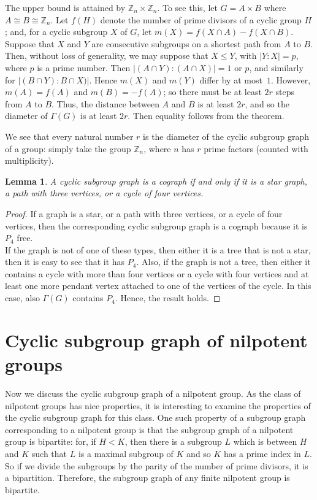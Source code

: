 \documentclass[11pt,twoside]{amsart}
\def \Z {{\mathbb{Z}}}
\def \Ga {{\Gamma }}
\newtheorem{lemma}[theorem]{Lemma}
\begin{document}
The upper bound is attained by $\Z_n\times\Z_n$. To see this, let
$G=A\times B$ where $A\cong B\cong\Z_n$. Let $f(H)$ denote the number of
prime divisors of a cyclic group $H$; and, for a cyclic subgroup $X$ of $G$,
let $m(X)=f(X\cap A)-f(X\cap B)$. Suppose that $X$ and $Y$ are consecutive
subgroups on a shortest path from $A$ to $B$. Then, without loss of
generality, we may suppose that $X\le Y$, with $|Y:X|=p$, where $p$ is a prime
number. Then $|(A\cap Y):(A\cap X)|=1$ or $p$, and similarly for
$|(B\cap Y):B\cap X)|$. Hence $m(X)$ and $m(Y)$ differ by at most~$1$. However,
$m(A)=f(A)$ and $m(B)=-f(A)$; so there must be at least $2r$ steps from $A$
to $B$. Thus, the distance between $A$ and $B$ is at least $2r$, and so the
diameter of $\Ga(G)$ is at least $2r$. Then equality follows from the theorem.

We see that every natural number $r$ is the diameter of the cyclic subgroup
graph of a group: simply take the group $\Z_n$, where $n$ has $r$ prime
factors (counted with multiplicity).

\begin{lemma}
    A cyclic subgroup graph is a cograph if and only if it is a star graph, a path with three vertices, or a cycle of four vertices.
\end{lemma}

\begin{proof}
    If a graph is a star, or a path with three vertices, or a cycle of four vertices, then the corresponding cyclic subgroup graph is a cograph because it is $P_4$ free.\\
    If the graph is not of one of these types, then either it is a tree that is not a star, then it is easy to see that it has $P_4$. Also, if the graph is not a tree, then either it contains a cycle with more than four vertices or a cycle with four vertices and at least one more pendant vertex attached to one of the vertices of the cycle. In this case, also $\Gamma (G)$ contains $P_4$. Hence, the result holds. 
\end{proof}
\section{Cyclic subgroup graph of nilpotent groups}\label{sec:nil}
Now we discuss the cyclic subgroup graph of a nilpotent group. As the class of nilpotent groups has nice properties, it is interesting to examine the properties of the cyclic subgroup graph for this class. One such property of a subgroup graph corresponding to a nilpotent group is that the subgroup graph of a nilpotent group is bipartite: for, if $H<K$, then there is a subgroup $L$ which is between $H$ and $K$ such that $L$ is a maximal subgroup of $K$ and so $K$
has a prime index in $L$. So if we divide the subgroups by the parity of the number of prime divisors, it is a bipartition. Therefore, the subgroup graph of any finite nilpotent group is bipartite. 
\end{document}
